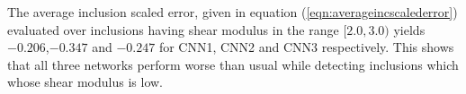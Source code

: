 \documentclass[12pt]{article}
\newcommand{\ra}[1]{\renewcommand{\arraystretch}{#1}}
\begin{document}
The average inclusion scaled error, given in equation (\ref{eqn:averageincscalederror}) evaluated over inclusions having shear modulus in the range $[2.0,3.0)$ yields $-0.206$,$-0.347$ and $-0.247$ for CNN1, CNN2 and CNN3 respectively. This shows that all three networks perform worse than usual while detecting inclusions which whose shear modulus is low. 
%
\end{document}
